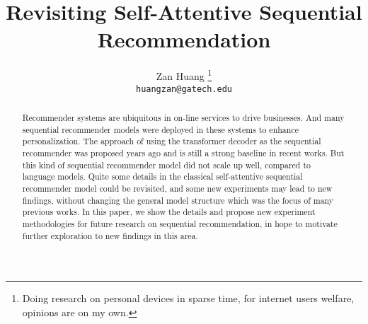 \documentclass{article}
\title{Revisiting Self-Attentive Sequential Recommendation}
\author{
    Zan Huang \thanks{Doing research on personal devices in sparse time, for internet users welfare, opinions are on my own.}\\
    \texttt{huangzan@gatech.edu}
}
\begin{document}
\maketitle

\begin{abstract}




Recommender systems are ubiquitous in on-line services to drive businesses.
And many sequential recommender models were deployed in these systems to enhance personalization. 
The approach of using the transformer decoder as the sequential recommender was proposed years ago and is still a strong baseline in recent works.
But this kind of sequential recommender model did not scale up well, compared to language models.
Quite some details in the classical self-attentive sequential recommender model could be revisited,
and some new experiments may lead to new findings,
without changing the general model structure
which was the focus of many previous works.
In this paper, we show the details and propose new experiment methodologies for future research on sequential recommendation, in hope to motivate further exploration to new findings in this area. %

\end{abstract}



\end{document}
